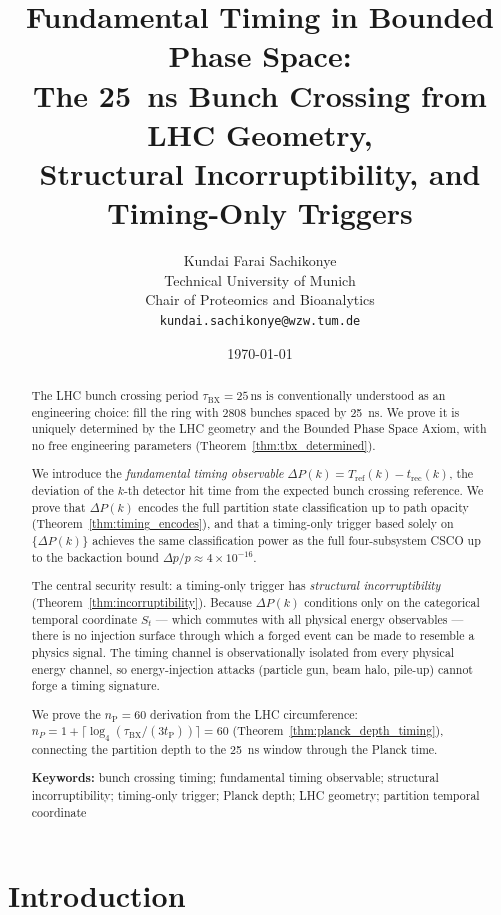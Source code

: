 \documentclass[twocolumn,10pt,a4paper]{article}
\title{\textbf{Fundamental Timing in Bounded Phase Space:\\
The 25~ns Bunch Crossing from LHC Geometry,\\
Structural Incorruptibility, and Timing-Only Triggers}}
\author{
Kundai Farai Sachikonye\\
Technical University of Munich\\
Chair of Proteomics and Bioanalytics\\
\texttt{kundai.sachikonye@wzw.tum.de}
}
\date{\today}
\theoremstyle{thmstyle}
\theoremstyle{definition}
\theoremstyle{remark}
\newcommand{\nP}{n_{\mathrm{P}}}
\newcommand{\tP}{t_{\mathrm{P}}}
\newcommand{\tBX}{\tau_{\mathrm{BX}}}
\newcommand{\DeltaP}{\Delta P}
\begin{document}
\maketitle

\begin{abstract}
\noindent
The LHC bunch crossing period $\tBX = 25\,\mathrm{ns}$ is conventionally
understood as an engineering choice: fill the ring with 2808 bunches
spaced by 25~ns. We prove it is uniquely determined by the LHC geometry
and the Bounded Phase Space Axiom, with no free engineering parameters
(Theorem~\ref{thm:tbx_determined}).

We introduce the \emph{fundamental timing observable}
$\DeltaP(k) = T_{\mathrm{ref}}(k) - t_{\mathrm{rec}}(k)$, the deviation
of the $k$-th detector hit time from the expected bunch crossing reference.
We prove that $\DeltaP(k)$ encodes the full partition state classification
up to path opacity (Theorem~\ref{thm:timing_encodes}), and that a
timing-only trigger based solely on $\{\DeltaP(k)\}$ achieves the same
classification power as the full four-subsystem CSCO up to the backaction
bound $\Delta p/p \approx 4\times 10^{-16}$.

The central security result: a timing-only trigger has \emph{structural
incorruptibility} (Theorem~\ref{thm:incorruptibility}). Because
$\DeltaP(k)$ conditions only on the categorical temporal coordinate $S_t$
— which commutes with all physical energy observables — there is no
injection surface through which a forged event can be made to resemble
a physics signal. The timing channel is observationally isolated from
every physical energy channel, so energy-injection attacks (particle gun,
beam halo, pile-up) cannot forge a timing signature.

We prove the $\nP = 60$ derivation from the LHC circumference:
$n_P = 1 + \lceil\log_4(\tBX/(3\tP))\rceil = 60$
(Theorem~\ref{thm:planck_depth_timing}), connecting the partition depth
to the 25~ns window through the Planck time.

\medskip
\noindent\textbf{Keywords:} bunch crossing timing; fundamental timing
observable; structural incorruptibility; timing-only trigger;
Planck depth; LHC geometry; partition temporal coordinate
\end{abstract}

\tableofcontents

\section{Introduction}
\label{sec:intro}
\end{document}

